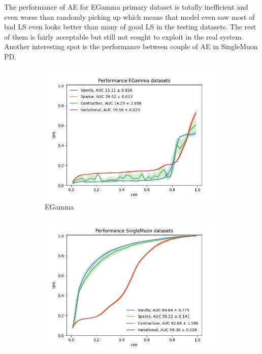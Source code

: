 The performance of AE for EGamma primary dataset is totally inefficient and even worse than randomly picking up which means that model even saw most of bad LS even looks better than many of good LS in the testing datasets. The rest of them is fairly acceptable but still not eought to exploit in the real system. Another interesting spot is the performance between couple of AE in SingleMuon PD. 

\begin{figure}[h!]
\centering
    \begin{subfigure}[b]{0.49\linewidth}
        \includegraphics[width=\linewidth]{images/reco/2018/feature_1/performance_EGamma_VanillaSparseContractiveVariational.png}
        \caption{EGamma}
    \end{subfigure}
    \begin{subfigure}[b]{0.49\linewidth}
        \includegraphics[width=\linewidth]{images/reco/2018/feature_1/performance_SingleMuon_VanillaSparseContractiveVariational.png}

\end{subfigure}
\end{figure}
